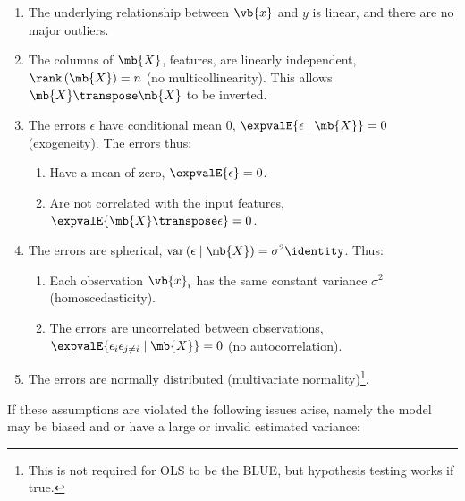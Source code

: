 \begin{enumerate}[noitemsep]
  \item The underlying relationship between $\vb{x}$ and $y$ is linear, and there are no major outliers.\label{item:regression:linear:linear}
  \item The columns of $\mb{X}$, \ie features, are linearly independent, \ie $\rank\left(\mb{X}\right) = n$ (no multicollinearity). This allows $\mb{X}\transpose\mb{X}$ to be inverted.\label{item:regression:linear:multicollinearity}
  \item The errors $\epsilon$ have conditional mean 0, $\expvalE{\epsilon \mid \mb{X}} = 0$ (exogeneity). The errors thus:\label{item:regression:linear:exogeneity}
  \begin{enumerate}[noitemsep]
    \item Have a mean of zero, $\expvalE{\epsilon} = 0$.
    \item Are not correlated with the input features, $\expvalE{\mb{X}\transpose\epsilon} = 0$.
  \end{enumerate}
  \item The errors are spherical, $\mathrm{var}\left(\epsilon \mid \mb{X}\right) = \sigma^{2} \identity$. Thus:\label{item:regression:linear:spherical}
  \begin{enumerate}[noitemsep]
    \item Each observation $\vb{x}_{i}$ has the same constant variance $\sigma^{2}$ (homoscedasticity).
    \item The errors are uncorrelated between observations, $\expvalE{\epsilon_{i}\epsilon_{j \neq i} \mid \mb{X}} = 0$ (no autocorrelation).
  \end{enumerate}
  \item The errors are normally distributed (multivariate normality)\footnote{This is not required for OLS to be the BLUE, but hypothesis testing works if true.}.\label{item:regression:linear:normality}
\end{enumerate}

If these assumptions are violated the following issues arise,
namely the model may be biased and or have a large or invalid estimated variance:

